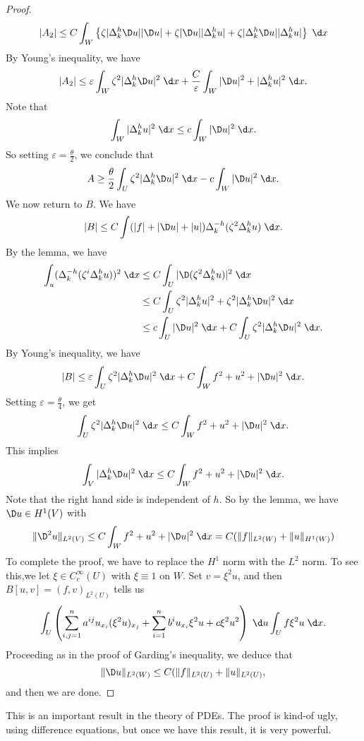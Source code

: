 \documentclass[a4paper]{article}
\begin{document}
\begin{proof}
  \[
    |A_2| \leq C \int_W \left\{\zeta |\Delta^h_k \D u| |\D u| + \zeta |\D u| |\Delta_k^h u| + \zeta |\Delta^h_k \D u| |\Delta^h_k u|\right\}\;\d x
  \]
  By Young's inequality, we have
  \[
    |A_2| \leq \varepsilon \int_W \zeta^2 |\Delta_k^h \D u|^2 \;\d x + \frac{C}{\varepsilon} \int_W |\D u|^2 + |\Delta_k^h u|^2\;\d x.
  \]
  Note that
  \[
    \int_W |\Delta_k^h u|^2\;\d x \leq c \int_W |\D u|^2 \;\d x.
  \]
  So setting $\varepsilon = \frac{\theta}{2}$, we conclude that
  \[
    A \geq \frac{\theta}{2} \int_U \zeta^2 |\Delta_k^h \D u|^2 \;\d x - c \int_W |\D u|^2\;\d x.
  \]
  We now return to $B$. We have
  \[
    |B| \leq C \int (|f| + |\D u| + |u|) \Delta^{-h}_k (\zeta^2 \Delta_k^h u)\;\d x.
  \]
  By the lemma, we have
  \begin{align*}
    \int_u (\Delta_k^{-h} (\zeta^i \Delta_k^h u))^2\;\d x &\leq C \int_U |\D(\zeta^2 \Delta_k^h u)|^2 \;\d x\\
    &\leq C \int_U \zeta^2 |\Delta_k^h u|^2 + \zeta^2 |\Delta^h_k \D u|^2\;\d x\\
    &\leq c \int_U |\D u|^2 \;\d x + C \int_U \zeta^2 |\Delta^h_k \D u|^2\;\d x.
  \end{align*}
  By Young's inequality, we have
  \[
    |B| \leq \varepsilon \int_U \zeta^2 |\Delta_k^h \D u|^2\;\d x + C \int_W f^2 + u^2 + |\D u|^2 \;\d x.
  \]
  Setting $\varepsilon = \frac{\theta}{4}$, we get
  \[
   \int_U \zeta^2 |\Delta_k^h \D u|^2 \;\d x \leq C \int_W f^2 + u^2 + |\D u|^2 \;\d x.
  \]
  This implies
  \[
    \int_V |\Delta_k^h \D u|^2 \;\d x \leq C \int_W f^2 + u^2 + |\D u|^2\;\d x.
  \]
  Note that the right hand side is independent of $h$. So by the lemma, we have $\D u \in H^1(V)$ with
  \[
    \|\D^2 u\|_{L^2(V)} \leq C \int_W f^2 + u^2 + |\D u|^2\;\d x = C (\|f\|_{L^2(W)} + \|u\|_{H^1(W)})
  \]
  To complete the proof, we have to replace the $H^1$ norm with the $L^2$ norm. To see this,we let $\xi \in C^\infty_c(U)$ with $\xi \equiv 1$ on $W$. Set $v = \xi^2 u$, and then $B[u, v] = (f, v)_{L^2(U)}$ tells us
  \[
    \int_U \left(\sum_{i, j = 1}^n a^{ij} u_{x_i} (\xi^2 u)_{x_j} + \sum_{i = 1}^n b^i u_{x_i} \xi^2 u + c \xi^2 u^2 \right) \;\d u \int_U f \xi^2 u\;\d x.
  \]
  Proceeding as in the proof of Garding's inequality, we deduce that
  \[
    \|\D u\|_{L^2(W)} \leq C (\|f\|_{L^2(U)} + \|u\|_{L^2(U)},
  \]
  and then we are done.
\end{proof}
This is an important result in the theory of PDEs. The proof is kind-of ugly, using difference equations, but once we have this result, it is very powerful.
\end{document}
